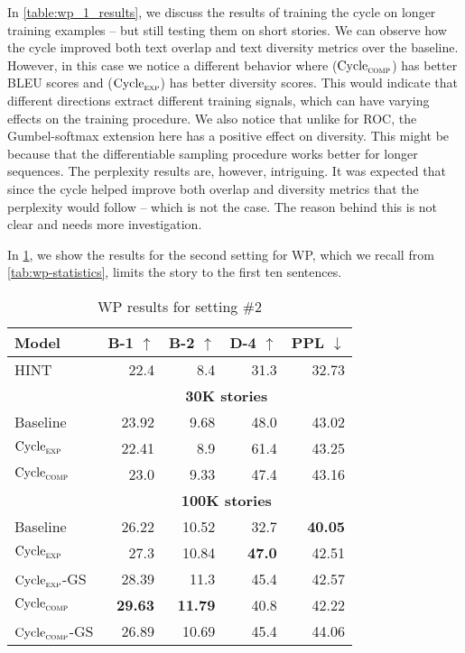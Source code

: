 In \cref{table:wp_1_results}, we discuss the results of training the cycle on longer training examples -- but still testing them on short stories. We can observe how the cycle improved both text overlap and text diversity metrics over the baseline. However, in this case we notice a different behavior where ($\text{Cycle}_{\textsc{comp}}$) has better BLEU scores and ($\text{Cycle}_{\textsc{exp}}$) has better diversity scores. This would indicate that different directions extract different training signals, which can have varying effects on the training procedure. We also notice that unlike for ROC, the Gumbel-softmax extension here has a positive effect on diversity. This might be because that the differentiable sampling procedure works better for longer sequences. The perplexity results are, however, intriguing. It was expected that since the cycle helped improve both overlap and diversity metrics that the perplexity would follow -- which is not the case. The reason behind this is not clear and needs more investigation.

In \cref{table:wp_2_results}, we show the results for the second setting for WP, which we recall from \cref{tab:wp-statistics}, limits the story to the first ten sentences.

\begin{table}[ht]
\centering
\begin{tabular}{l|rr|r|r}
Model & B-1 $\uparrow$ & B-2 $\uparrow$ & D-4 $\uparrow$ & PPL $\downarrow$  \\ \hline
HINT & 22.4 & 8.4 & 31.3 & 32.73 \\ \hline

 & \multicolumn{4}{c}{\textbf{30K stories}} \\ \hline
Baseline & 23.92 & 9.68 & 48.0  & 43.02 \\
$\text{Cycle}_{\textsc{exp}}$ & 22.41 & 8.9 & 61.4 & 43.25 \\
$\text{Cycle}_{\textsc{comp}}$ & 23.0 & 9.33 & 47.4 & 43.16 \\ \hline

 & \multicolumn{4}{c}{\textbf{100K stories}} \\ \hline
Baseline & 26.22 & 10.52 & 32.7  & \textbf{40.05} \\
$\text{Cycle}_{\textsc{exp}}$ & 27.3 & 10.84 & \textbf{47.0} & 42.51 \\
$\text{Cycle}_{\textsc{exp}}$-GS & 28.39 & 11.3 & 45.4 & 42.57 \\
$\text{Cycle}_{\textsc{comp}}$ & \textbf{29.63} & \textbf{11.79} & 40.8 & 42.22 \\
$\text{Cycle}_{\textsc{comp}}$-GS & 26.89 & 10.69 & 45.4 & 44.06
\end{tabular}
\caption{WP results for setting \#2}
\label{table:wp_2_results}
\end{table}

